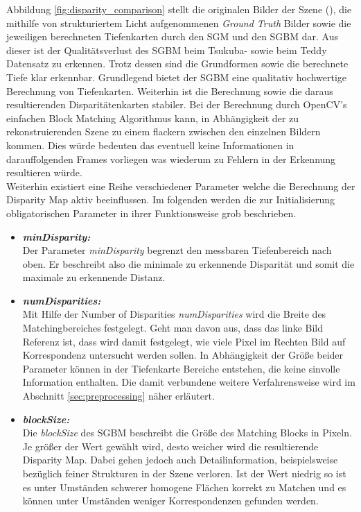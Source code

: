 \noindent
Abbildung \ref{fig:disparity_comparison} stellt die originalen Bilder der Szene (\cite{middlebury_data}), die mithilfe von strukturiertem Licht aufgenommenen \emph{Ground Truth} Bilder sowie die jeweiligen berechneten Tiefenkarten durch den SGM und den SGBM dar. Aus dieser ist der Qualitätsverlust des SGBM beim Tsukuba- sowie beim Teddy Datensatz zu erkennen. Trotz dessen sind die Grundformen sowie die berechnete Tiefe klar erkennbar. Grundlegend bietet der SGBM eine qualitativ hochwertige Berechnung von Tiefenkarten. Weiterhin ist die Berechnung sowie die daraus resultierenden Disparitätenkarten stabiler. Bei der Berechnung durch OpenCV's einfachen Block Matching Algorithmus kann, in Abhängigkeit der zu rekonstruierenden Szene zu einem flackern zwischen den einzelnen Bildern kommen. Dies würde bedeuten das eventuell keine Informationen in darauffolgenden Frames vorliegen was wiederum zu Fehlern in der Erkennung resultieren würde.\\

\noindent
Weiterhin existiert eine Reihe verschiedener Parameter welche die Berechnung der Disparity Map aktiv beeinflussen. Im folgenden werden die zur Initialisierung obligatorischen Parameter in ihrer Funktionsweise grob beschrieben.

\begin{itemize}
	\item \textbf{\emph{minDisparity:}}\\
	Der Parameter \emph{minDisparity} begrenzt den messbaren Tiefenbereich nach oben. Er beschreibt also die minimale zu erkennende Disparität und somit die maximale zu erkennende Distanz.
 	\item \textbf{\emph{numDisparities:}}\\
 	Mit Hilfe der Number of Disparities \emph{numDisparities} wird die Breite des Matchingbereiches festgelegt. Geht man davon aus, dass das linke Bild Referenz ist, dass wird damit festgelegt, wie viele Pixel im Rechten Bild auf Korrespondenz untersucht werden sollen. In Abhängigkeit der Größe beider Parameter können in der Tiefenkarte Bereiche entstehen, die keine sinvolle Information enthalten. Die damit verbundene weitere Verfahrensweise wird im Abschnitt \ref{sec:preprocessing} näher erläutert.
	\item \textbf{\emph{blockSize:}}\\
	Die \emph{blockSize} des SGBM beschreibt die Größe des Matching Blocks in Pixeln. Je größer der Wert gewählt wird, desto weicher wird die resultierende Disparity Map. Dabei gehen jedoch auch Detailinformation, beispielsweise bezüglich feiner Strukturen in der Szene verloren. Ist der Wert niedrig so ist es unter Umständen schwerer homogene Flächen korrekt zu Matchen und es können unter Umständen weniger Korrespondenzen gefunden werden.
\end{itemize}

